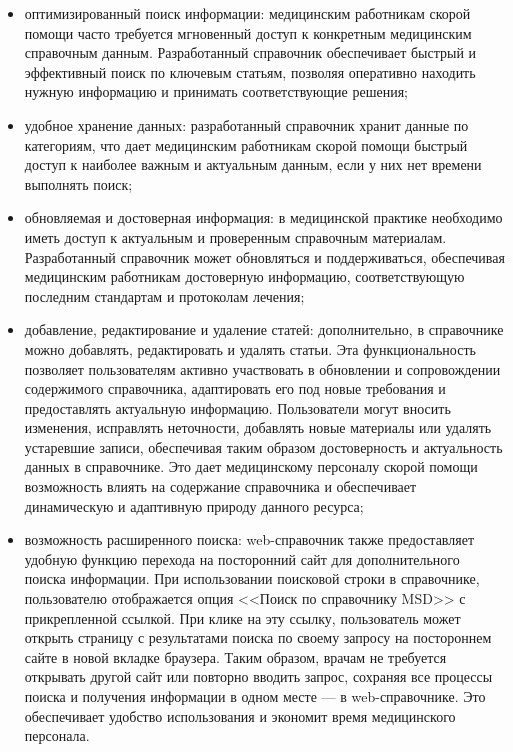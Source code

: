 \begin{itemize}
    \item оптимизированный поиск информации: медицинским работникам скорой помощи часто требуется мгновенный доступ к конкретным медицинским справочным данным. Разработанный справочник обеспечивает быстрый и эффективный поиск по ключевым статьям, позволяя оперативно находить нужную информацию и принимать соответствующие решения;
    \item удобное хранение данных: разработанный справочник хранит данные по категориям, что дает медицинским работникам скорой помощи быстрый доступ к наиболее важным и актуальным данным, если у них нет времени выполнять поиск;
    \item обновляемая и достоверная информация: в медицинской практике необходимо иметь доступ к актуальным и проверенным справочным материалам. Разработанный справочник может обновляться и поддерживаться, обеспечивая медицинским работникам достоверную информацию, соответствующую последним стандартам и протоколам лечения;
    \item добавление, редактирование и удаление статей: дополнительно, в справочнике можно добавлять, редактировать и удалять статьи. Эта функциональность позволяет пользователям активно участвовать в обновлении и сопровождении содержимого справочника, адаптировать его под новые требования и предоставлять актуальную информацию. Пользователи могут вносить изменения, исправлять неточности, добавлять новые материалы или удалять устаревшие записи, обеспечивая таким образом достоверность и актуальность данных в справочнике. Это дает медицинскому персоналу скорой помощи возможность влиять на содержание справочника и обеспечивает динамическую и адаптивную природу данного ресурса;
    \item возможность расширенного поиска: web-справочник также предоставляет удобную функцию перехода на посторонний сайт для дополнительного поиска информации. При использовании поисковой строки в справочнике, пользователю отображается опция <<Поиск по справочнику MSD>> с прикрепленной ссылкой. При клике на эту ссылку, пользователь может открыть страницу с результатами поиска по своему запросу на постороннем сайте в новой вкладке браузера. Таким образом, врачам не требуется открывать другой сайт или повторно вводить запрос, сохраняя все процессы поиска и получения информации в одном месте — в web-справочнике. Это обеспечивает удобство использования и экономит время медицинского персонала.
\end{itemize}

